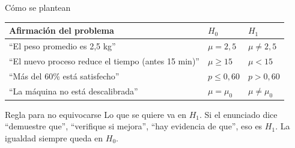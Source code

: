 \documentclass[aspectratio=169,10pt]{beamer}
\begin{document}
\begin{frame}{Cómo se plantean}
  \footnotesize
  \begin{center}
  \begin{tabular}{@{}p{5.4cm}p{2.6cm}p{2.6cm}@{}}
    \toprule
    \textbf{Afirmación del problema} & \textbf{$H_0$} & \textbf{$H_1$} \\
    \midrule
    ``El peso promedio es 2{,}5 kg'' & $\mu=2{,}5$ & $\mu\neq 2{,}5$ \\
    ``El nuevo proceso reduce el tiempo (antes 15 min)'' &
      $\mu\ge 15$ & $\mu<15$ \\
    ``Más del 60\% está satisfecho'' & $p\le 0{,}60$ & $p>0{,}60$ \\
    ``La máquina no está descalibrada'' & $\mu=\mu_0$ & $\mu\neq\mu_0$ \\
    \bottomrule
  \end{tabular}
  \end{center}

  \vspace{0.25cm}
  \begin{alertblock}{Regla para no equivocarse}
    \footnotesize
    Lo que se quiere  va en $H_1$. Si el enunciado dice
    ``demuestre que'', ``verifique si mejora'', ``hay evidencia de que'', eso es
    $H_1$. La igualdad siempre queda en $H_0$.
  \end{alertblock}
\end{frame}

\end{document}
